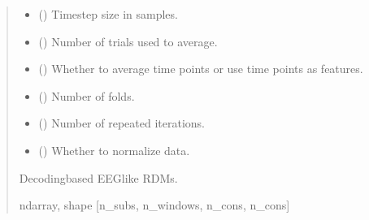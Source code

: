 \documentclass[letterpaper,10pt,english]{sphinxhowto}
\begin{document}
\begin{fulllineitems}
\begin{quote}
\begin{description}
\begin{itemize}
\item {} 
\sphinxAtStartPar
{} (\sphinxstyleliteralemphasis{\sphinxupquote{, }}) \textendash{} Time\sphinxhyphen{}step size in samples.

\item {} 
\sphinxAtStartPar
{} (\sphinxstyleliteralemphasis{\sphinxupquote{, }}) \textendash{} Number of trials used to average.

\item {} 
\sphinxAtStartPar
{} (\sphinxstyleliteralemphasis{\sphinxupquote{, }}\sphinxstyleliteralemphasis{\sphinxupquote{, }}) \textendash{} Whether to average time points or use time points as features.

\item {} 
\sphinxAtStartPar
{} (\sphinxstyleliteralemphasis{\sphinxupquote{, }}) \textendash{} Number of folds.

\item {} 
\sphinxAtStartPar
{} (\sphinxstyleliteralemphasis{\sphinxupquote{, }}) \textendash{} Number of repeated iterations.

\item {} 
\sphinxAtStartPar
{} (\sphinxstyleliteralemphasis{\sphinxupquote{, }}) \textendash{} Whether to normalize data.

\end{itemize}

\sphinxAtStartPar
{} \textendash{} Decoding\sphinxhyphen{}based EEG\sphinxhyphen{}like RDMs.

\sphinxAtStartPar
ndarray, shape {[}n\_subs, n\_windows, n\_cons, n\_cons{]}

\end{description}\end{quote}

\end{fulllineitems}
\end{document}
